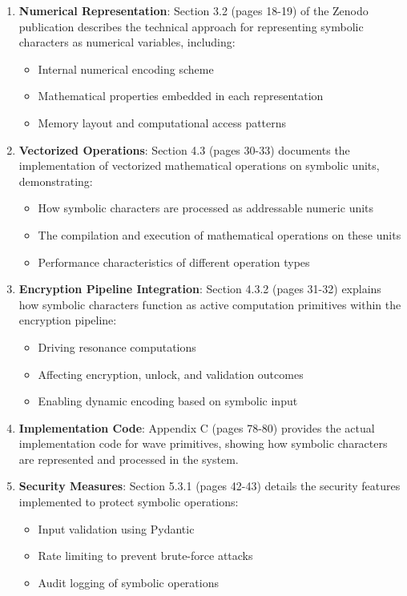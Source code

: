 \documentclass[12pt,letterpaper]{article}
\begin{document}
\begin{enumerate}[label=\arabic*.]
\item \textbf{Numerical Representation}: Section 3.2 (pages 18-19) of the Zenodo publication describes the technical approach for representing symbolic characters as numerical variables, including:
   \begin{itemize}
   \item Internal numerical encoding scheme
   \item Mathematical properties embedded in each representation
   \item Memory layout and computational access patterns
   \end{itemize}

\item \textbf{Vectorized Operations}: Section 4.3 (pages 30-33) documents the implementation of vectorized mathematical operations on symbolic units, demonstrating:
   \begin{itemize}
   \item How symbolic characters are processed as addressable numeric units
   \item The compilation and execution of mathematical operations on these units
   \item Performance characteristics of different operation types
   \end{itemize}

\item \textbf{Encryption Pipeline Integration}: Section 4.3.2 (pages 31-32) explains how symbolic characters function as active computation primitives within the encryption pipeline:
   \begin{itemize}
   \item Driving resonance computations
   \item Affecting encryption, unlock, and validation outcomes
   \item Enabling dynamic encoding based on symbolic input
   \end{itemize}

\item \textbf{Implementation Code}: Appendix C (pages 78-80) provides the actual implementation code for wave primitives, showing how symbolic characters are represented and processed in the system.

\item \textbf{Security Measures}: Section 5.3.1 (pages 42-43) details the security features implemented to protect symbolic operations:
   \begin{itemize}
   \item Input validation using Pydantic
   \item Rate limiting to prevent brute-force attacks
   \item Audit logging of symbolic operations
   \end{itemize}
\end{enumerate}
\end{document}
